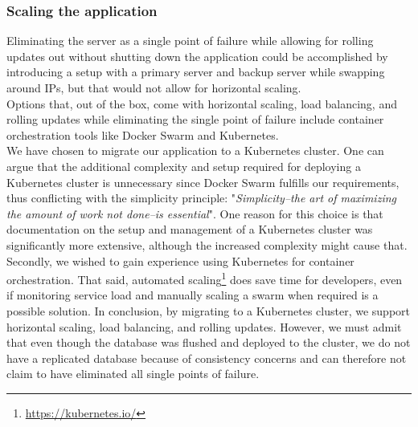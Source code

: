 \subsubsection{Scaling the application}
\label{subsubsec:scalingApp}
Eliminating the server as a single point of failure while allowing for rolling updates out without shutting down the application could be accomplished by introducing a setup with a primary server and backup server while swapping around IPs, but that would not allow for horizontal scaling.\\
Options that, out of the box, come with horizontal scaling, load balancing, and rolling updates while eliminating the single point of failure include container orchestration tools like Docker Swarm and Kubernetes.\\ 
We have chosen to migrate our application to a Kubernetes cluster. One can argue that the additional complexity and setup required for deploying a Kubernetes cluster is unnecessary since Docker Swarm fulfills our requirements, thus conflicting with the simplicity principle: "\textit{Simplicity--the art of maximizing the amount of work not done--is essential}"\cite{beck2001agile}. 
One reason for this choice is that documentation on the setup and management of a Kubernetes cluster was significantly more extensive, although the increased complexity might cause that. Secondly, we wished to gain experience using Kubernetes for container orchestration. That said, automated scaling\footnote{\url{https://kubernetes.io/}} does save time for developers, even if monitoring service load and manually scaling a swarm when required is a possible solution. In conclusion, by migrating to a Kubernetes cluster, we support horizontal scaling, load balancing, and rolling updates. However, we must admit that even though the database was flushed and deployed to the cluster, we do not have a replicated database because of consistency concerns and can therefore not claim to have eliminated all single points of failure.

